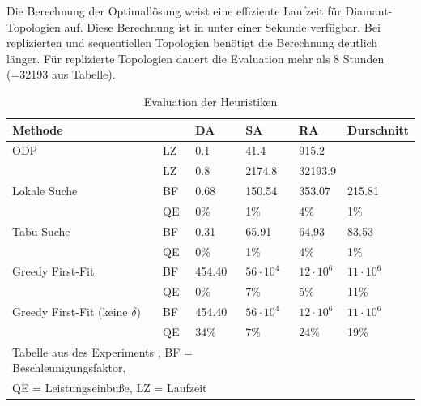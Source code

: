 \documentclass{article}
\begin{document}
Die Berechnung der Optimallösung weist eine effiziente Laufzeit für Diamant-Topologien auf. 
Diese Berechnung ist in unter einer Sekunde verfügbar. Bei replizierten und sequentiellen Topologien benötigt die Berechnung deutlich länger. 
Für replizierte Topologien dauert die Evaluation mehr als 8 Stunden (=32193 aus Tabelle). \\
\begin{table}[htbp]  
    \centering
    \caption{Evaluation der Heuristiken}
    \begin{tabular}{llllll}
    \toprule
    Methode                          &       & DA        & SA              & RA                & Durschnitt       \\
    \midrule
    ODP                              &LZ     &  0.1      & 41.4             & 915.2            &                  \\
                                     &LZ     &  0.8      & 2174.8           & 32193.9          &                  \\
    \cmidrule{1-5}
    Lokale Suche                     &BF     &  0.68     & 150.54           & 353.07           & 215.81           \\
                                     &QE     &0\%        & 1\%              &4\%               & 1\%              \\
    Tabu Suche                       &BF     &  0.31     & 65.91            & 64.93            & 83.53            \\
                                     &QE     &0\%        & 1\%              &4\%               & 1\%              \\           
    Greedy First-Fit                 &BF     &  454.40   & $56 \cdot 10^4$  & $12 \cdot 10^6$  & $11 \cdot 10^6$  \\
                                     &QE     &0\%        & 7\%              &5\%               &11\%              \\
    Greedy First-Fit (keine $\delta$)&BF     &  454.40   & $56 \cdot 10^4$  & $12 \cdot 10^6$  & $11 \cdot 10^6$  \\
                                     &QE     &34\%       & 7\%              &24\%              & 19\%             \\
    \bottomrule
    \multicolumn{4}{l}{\footnotesize Tabelle aus des Experiments \cite{efficient-operator-placement}, BF = Beschleunigungsfaktor,}\\
    \multicolumn{4}{l}{\footnotesize QE = Leistungseinbuße, LZ = Laufzeit}\\
    \end{tabular}
    \label{experiment-tabelle}
\end{table} 
\end{document}
